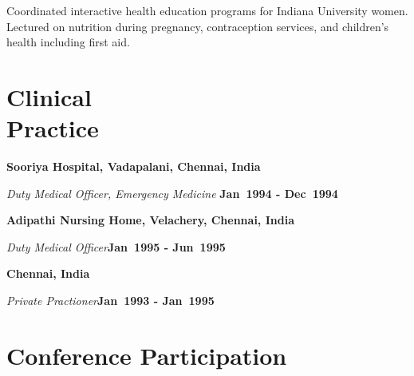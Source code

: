 \documentclass[margin,line]{res}
\begin{document}
\begin{resume}
Coordinated interactive health education programs for Indiana
University women.  Lectured on nutrition during pregnancy,
contraception services, and children's health including first
aid.

\section{\sc Clinical\\ Practice}
{\bf Sooriya Hospital, Vadapalani, Chennai, India}

\vspace{-0.4cm}

\emph{Duty Medical Officer, Emergency Medicine}\hfill {\bf
  Jan~1994 - Dec~1994}

\vspace{-0.2cm}



{\bf Adipathi Nursing Home, Velachery, Chennai, India}

\vspace{-0.4cm}

\emph{Duty Medical Officer}\hfill {\bf  Jan~1995 - Jun~1995}

\vspace{-0.2cm}



{\bf Chennai, India}

\vspace{-0.4cm}

\emph{Private Practioner}\hfill {\bf Jan~1993 - Jan~1995}\\

\vspace{-0.2cm}






\section{\sc Conference Participation}


\end{resume}
\end{document}

